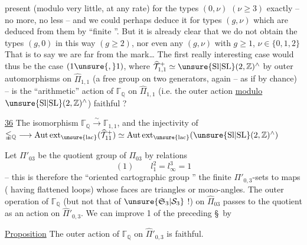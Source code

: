 present (modulo very little, at any rate)
for the types $(0,\nu)$ $(\nu\geq 3)$ exactly
-- no more, no less -- and we could
perhaps deduce it for types $(g,\nu)$
which are deduced from them by ``finite ''.
But it is already clear that we do not obtain
the types $(g,0)$ in this way $(g\geq 2)$,
nor even any $(g,\nu)$ with $g\geq 1$, $\nu\in\{0,1,2\}$
That is to say we are far from the mark\ldots
The first really interesting case would
thus be the case $(1\unsure{,}1)$, where
$\widehat{\mathcal{T}}_{1,1}^{+}\simeq
\unsure{\mathrm{Sl}|\mathrm{SL}}(2,\mathbb{Z})^{\wedge}$
 by outer automorphisms on $\widehat{\Pi}_{1,1}$
(a free group on two generators, again
-- as if by chance) -- is the
``arithmetic'' action of $\mathbb{\Gamma}_{\mathbb{Q}}$ on $\widehat{\Pi}_{1,1}$
(i.e. the outer action \uline{modulo}
$\unsure{\mathrm{Sl}|\mathrm{SL}}(2,\mathbb{Z})^{\wedge}$)
faithful ?

\uline{36} The isomorphism
$\mathbb{\Gamma}_{\mathbb{Q}}\xrightarrow{\sim}\mathbb{\Gamma}_{1,1}$,
and the injectivity of
$\mathbb{\Gamma}_{\mathbb{Q}}\longrightarrow
\mathrm{Aut\,ext}_{\unsure{\mathrm{lac}}}(\widehat{\mathcal{T}}_{11}^{+})
\simeq\mathrm{Aut\,ext}_{\unsure{\mathrm{lac}}}(\unsure{\mathrm{Sl}|\mathrm{SL}}(2,\mathbb{Z})^{\wedge})$

Let $\Pi'_{03}$ be the quotient group of $\Pi_{03}$
 by  relations
\[
(1)\qquad l_1^2=l_\infty^3=1
\]
-- this is therefore the ``oriented cartographic
group ''\unsure{,|;}
 the finite $\Pi'_{0,3}$-sets
  to
  maps ( having
flattened loops) whose faces are
triangles or mono-angles. The outer
operation of $\mathbb{\Gamma}_{\mathbb{Q}}$
(but not that of $\unsure{\mathfrak{S}_3|\mathcal{S}_3}$ !)
on $\widehat{\Pi}_{03}$ passes to the quotient as an
action on $\widehat{\Pi}'_{0,3}$. We can improve
 1 of the preceding \S\ by 

\uline{Proposition} The outer action of $\mathbb{\Gamma}_{\mathbb{Q}}$
on $\widehat{\Pi}'_{0,3}$ is faithful.

